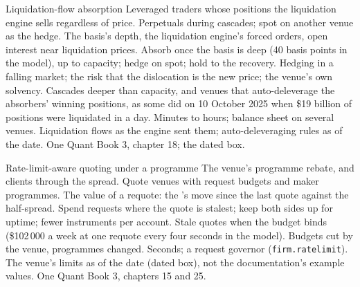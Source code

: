 \begin{strategyfile}{Liquidation-flow absorption}\label{strat:hf:crypto-high-frequency-trading-on-centralised-venues:liquidation}
 Leveraged traders whose positions the liquidation engine sells regardless of price.
 Perpetuals during cascades; spot on another venue as the hedge.
 The basis's depth, the liquidation engine's forced orders, open interest near liquidation prices.
 Absorb once the basis is deep (40 basis points in the model), up to capacity; hedge on spot; hold to the recovery.
 Hedging in a falling market; the risk that the dislocation is the new price; the venue's own solvency.
 Cascades deeper than capacity, and venues that auto-deleverage the absorbers' winning positions, as some did on 10 October 2025
when \$19 billion of positions were liquidated in a day.
 Minutes to hours; balance sheet on several venues.
 Liquidation flows as the engine sent them; auto-deleveraging rules as of the date.
 One Quant Book 3, chapter 18; the dated box.
\end{strategyfile}

\begin{strategyfile}{Rate-limit-aware quoting under a programme}\label{strat:hf:crypto-high-frequency-trading-on-centralised-venues:ratelimit}
 The venue's programme rebate, and clients through the spread.
 Quote venues with request budgets and maker programmes.
 The value of a requote: the 's move since the last quote against the half-spread.
 Spend requests where the quote is stalest; keep both sides up for uptime; fewer instruments per account.
 Stale quotes when the budget binds (\$102\,000 a week at one requote every four seconds in the model).
 Budgets cut by the venue, programmes changed.
 Seconds; a request governor (\texttt{firm.ratelimit}).
 The venue's limits as of the date (dated box), not the documentation's example values.
 One Quant Book 3, chapters 15 and 25.
\end{strategyfile}

